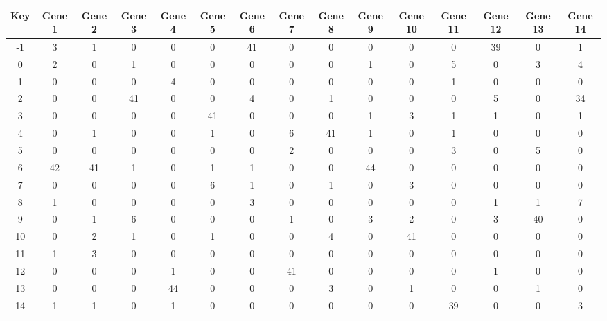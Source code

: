 \begin{tabular}{|c|c|c|c|c|c|c|c|c|c|c|c|c|c|c|}
\hline
Key & Gene 1 & Gene 2 & Gene 3 & Gene 4 & Gene 5 & Gene 6 & Gene 7 & Gene 8 & Gene 9 & Gene 10 & Gene 11 & Gene 12 & Gene 13 & Gene 14 \\
\hline
-1 & 3 & 1 & 0 & 0 & 0 & 41 & 0 & 0 & 0 & 0 & 0 & 39 & 0 & 1 \\
0 & 2 & 0 & 1 & 0 & 0 & 0 & 0 & 0 & 1 & 0 & 5 & 0 & 3 & 4 \\
1 & 0 & 0 & 0 & 4 & 0 & 0 & 0 & 0 & 0 & 0 & 1 & 0 & 0 & 0 \\
2 & 0 & 0 & 41 & 0 & 0 & 4 & 0 & 1 & 0 & 0 & 0 & 5 & 0 & 34 \\
3 & 0 & 0 & 0 & 0 & 41 & 0 & 0 & 0 & 1 & 3 & 1 & 1 & 0 & 1 \\
4 & 0 & 1 & 0 & 0 & 1 & 0 & 6 & 41 & 1 & 0 & 1 & 0 & 0 & 0 \\
5 & 0 & 0 & 0 & 0 & 0 & 0 & 2 & 0 & 0 & 0 & 3 & 0 & 5 & 0 \\
6 & 42 & 41 & 1 & 0 & 1 & 1 & 0 & 0 & 44 & 0 & 0 & 0 & 0 & 0 \\
7 & 0 & 0 & 0 & 0 & 6 & 1 & 0 & 1 & 0 & 3 & 0 & 0 & 0 & 0 \\
8 & 1 & 0 & 0 & 0 & 0 & 3 & 0 & 0 & 0 & 0 & 0 & 1 & 1 & 7 \\
9 & 0 & 1 & 6 & 0 & 0 & 0 & 1 & 0 & 3 & 2 & 0 & 3 & 40 & 0 \\
10 & 0 & 2 & 1 & 0 & 1 & 0 & 0 & 4 & 0 & 41 & 0 & 0 & 0 & 0 \\
11 & 1 & 3 & 0 & 0 & 0 & 0 & 0 & 0 & 0 & 0 & 0 & 0 & 0 & 0 \\
12 & 0 & 0 & 0 & 1 & 0 & 0 & 41 & 0 & 0 & 0 & 0 & 1 & 0 & 0 \\
13 & 0 & 0 & 0 & 44 & 0 & 0 & 0 & 3 & 0 & 1 & 0 & 0 & 1 & 0 \\
14 & 1 & 1 & 0 & 1 & 0 & 0 & 0 & 0 & 0 & 0 & 39 & 0 & 0 & 3 \\
\hline
\end{tabular}